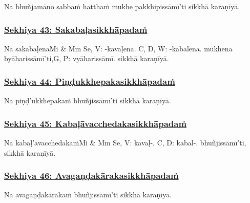 Na bhuñjamāno sabbaṁ hatthaṁ mukhe pakkhipissāmī'ti sikkhā karaṇīyā.



\subsubsection*{\hyperref[training43]{Sekhiya 43: Sakabaḷasikkhāpadaṁ}}
\label{sekh43}

Na sakabaḷena\makeatletter\hyperlink{endnote-appendix}\makeatother Mi & Mm Se, V: -kavaḷena. C, D, W: -kabalena.  mukhena byāharissāmī'ti,\makeatletter\hyperlink{endnote-appendix}\makeatother G, P: vyāharissāmī. sikkhā karaṇīyā.



\subsubsection*{\hyperref[training44]{Sekhiya 44: Piṇḍukkhepakasikkhāpadaṁ}}
\label{sekh44}

Na piṇḍ'ukkhepakaṁ bhuñjissāmī'ti sikkhā karaṇīyā.



\subsubsection*{\hyperref[training45]{Sekhiya 45: Kabaḷāvacchedakasikkhāpadaṁ}}
\label{sekh45}

Na kabaḷ'āvacchedakaṁ\makeatletter\hyperlink{endnote-appendix}\makeatother Mi & Mm Se, V: kavaḷ-. C, D: kabal-. bhuñjissāmī'ti, sikkhā karaṇīyā.



\subsubsection*{\hyperref[training46]{Sekhiya 46: Avagaṇḍakārakasikkhāpadaṁ}}
\label{sekh46}

Na avagaṇḍakārakaṁ bhuñjissāmī'ti sikkhā karaṇīyā.



